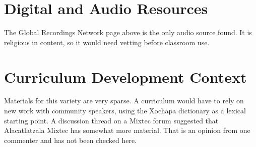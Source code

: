 \documentclass[12pt]{article}
\begin{document}
\section{Digital and Audio Resources}
The Global Recordings Network page above is the only audio source found. It is religious in content, so it would need vetting before classroom use.

\section{Curriculum Development Context}
Materials for this variety are very sparse. A curriculum would have to rely on new work with community speakers, using the Xochapa dictionary as a lexical starting point. A discussion thread on a Mixtec forum suggested that Alacatlatzala Mixtec has somewhat more material. That is an opinion from one commenter and has not been checked here.
\end{document}
